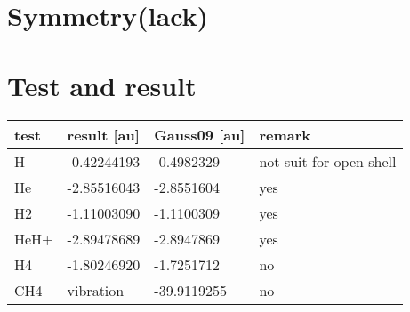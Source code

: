 \documentclass[11pt]{article}
\begin{document}
    \section{Symmetry(lack)}\label{symmetrylack}

    \section{Test and result}\label{test-and-result}

\begin{longtable}[]{@{}llll@{}}
\toprule
test & result {[}au{]} & Gauss09 {[}au{]} & remark\tabularnewline
\midrule
\endhead
H & -0.42244193 & -0.4982329 & not suit for open-shell\tabularnewline
He & -2.85516043 & -2.8551604 & yes\tabularnewline
H2 & -1.11003090 & -1.1100309 & yes\tabularnewline
HeH+ & -2.89478689 & -2.8947869 & yes\tabularnewline
H4 & -1.80246920 & -1.7251712 & no\tabularnewline
CH4 & vibration & -39.9119255 & no\tabularnewline
\bottomrule
\end{longtable}


    
    
    
    
\end{document}
